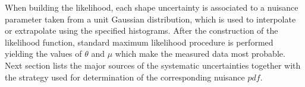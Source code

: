 When building the likelihood, each shape uncertainty is associated to a nuisance parameter taken from a unit Gaussian distribution, which is used to interpolate or extrapolate using the specified histograms. After the construction of the likelihood function, standard maximum likelihood procedure is performed yielding the values of $\theta$ and $\mu$ which make the measured data most probable. Next section lists the major sources of the systematic uncertainties together with the strategy used for determination of the corresponding nuisance $pdf$.                                                                                                                                                                                                                                                                                                                                                                                                                                                                                                                                                                                                                                                                                                                                                                                                                                                                                                                                                                                                                                                                                                                                                                                                                                                                                                                                                                                                                                                                                                                                                                                                                                                                                                                                                                                                                                                                                                                                                                                                                                                                                                                                                                                                                                                                                                                                                        




